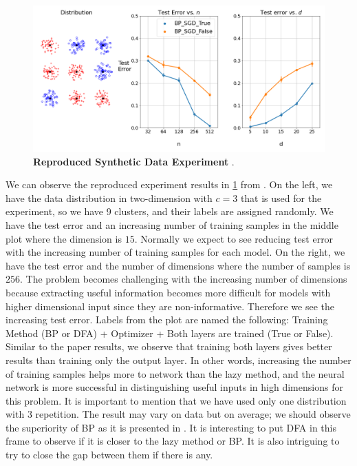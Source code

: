 \documentclass[a4paper, nobind]{templates/ociamthesis}
\begin{document}
\begin{figure}

{\centering \includegraphics[width=1\linewidth]{figures/2_syntheticData_reproduced} 

}

\caption[Reproduced Synthetic Data Experiment]{\textbf{Reproduced Synthetic Data Experiment} .}\label{fig:randomData}
\end{figure}

\noindent We can observe the reproduced experiment results in \ref{fig:randomData} from \cite{chizat2020implicit}. On the left, we have the data distribution in two-dimension with \(c=3\) that is used for the experiment, so we have 9 clusters, and their labels are assigned randomly. We have the test error and an increasing number of training samples in the middle plot where the dimension is \(15\). Normally we expect to see reducing test error with the increasing number of training samples for each model. On the right, we have the test error and the number of dimensions where the number of samples is \(256\). The problem becomes challenging with the increasing number of dimensions because extracting useful information becomes more difficult for models with higher dimensional input since they are non-informative. Therefore we see the increasing test error. Labels from the plot are named the following: Training Method (BP or DFA) + Optimizer + Both layers are trained (True or False). Similar to the paper results, we observe that training both layers gives better results than training only the output layer. In other words, increasing the number of training samples helps more to network than the lazy method, and the neural network is more successful in distinguishing useful inputs in high dimensions for this problem. It is important to mention that we have used only one distribution with \(3\) repetition. The result may vary on data but on average; we should observe the superiority of BP as it is presented in \cite{chizat2020implicit}. It is interesting to put DFA in this frame to observe if it is closer to the lazy method or BP. It is also intriguing to try to close the gap between them if there is any.\\
\end{document}
